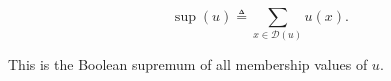 $$\sup(u) \triangleq \sum_{x \in \mathcal{D}(u)} u(x).$$

This is the Boolean supremum of all membership values of $u$.
